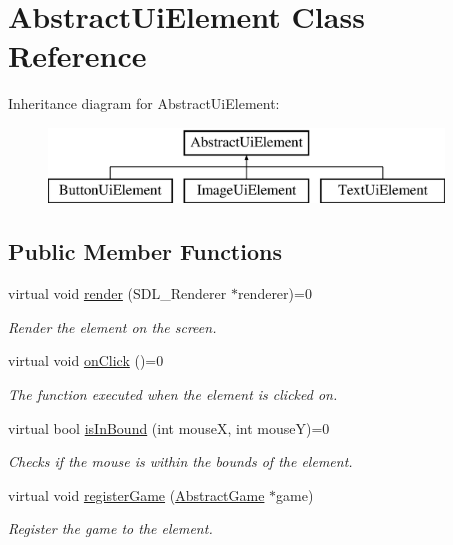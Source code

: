 \hypertarget{class_abstract_ui_element}{}\section{Abstract\+Ui\+Element Class Reference}
\label{class_abstract_ui_element}
Inheritance diagram for Abstract\+Ui\+Element\+:\begin{figure}[H]
\begin{center}
\leavevmode
\includegraphics[height=2.000000cm]{class_abstract_ui_element}
\end{center}
\end{figure}
\subsection*{Public Member Functions}
\begin{DoxyCompactItemize}
\item 
virtual void \mbox{\hyperlink{class_abstract_ui_element_afacedc89a5805d95d3bdcf20619b1c06}{render}} (S\+D\+L\+\_\+\+Renderer $\ast$renderer)=0
\begin{DoxyCompactList}\small\item\em Render the element on the screen. \end{DoxyCompactList}\item 
virtual void \mbox{\hyperlink{class_abstract_ui_element_a42296c15c9e70b6ac7fda0b1862612af}{on\+Click}} ()=0
\begin{DoxyCompactList}\small\item\em The function executed when the element is clicked on. \end{DoxyCompactList}\item 
virtual bool \mbox{\hyperlink{class_abstract_ui_element_ad2c415461cd7e8c1ee50b1105eb84685}{is\+In\+Bound}} (int mouseX, int mouseY)=0
\begin{DoxyCompactList}\small\item\em Checks if the mouse is within the bounds of the element. \end{DoxyCompactList}\item 
virtual void \mbox{\hyperlink{class_abstract_ui_element_aea8a32a77e77f601ca114b8738072079}{register\+Game}} (\mbox{\hyperlink{class_abstract_game}{Abstract\+Game}} $\ast$game)
\begin{DoxyCompactList}\small\item\em Register the game to the element. \end{DoxyCompactList}\end{DoxyCompactItemize}
